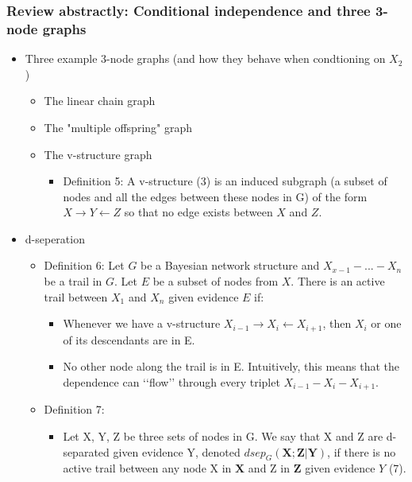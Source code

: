 \documentclass[10pt,containsverbatim,paralist]{article}
\begin{document}
\subsubsection*{Review abstractly: Conditional independence and three 3-node graphs}
\label{sec-1-1-4}
\begin{itemize}
\item Three example 3-node graphs (and how they behave when condtioning on $X_2$)
\label{sec-1-1-4-1}
\begin{itemize}
\item The linear chain graph
\label{sec-1-1-4-1-1}
\item The "multiple offspring" graph
\label{sec-1-1-4-1-2}
\item The v-structure graph
\label{sec-1-1-4-1-3}
\begin{itemize}
\item Definition 5:
\label{sec-1-1-4-1-3-1}
A v-structure (3) is an induced subgraph (a subset of nodes and all the edges between these nodes in G) of the form $X\rightarrow Y \leftarrow Z$ so that no edge exists between $X$ and
$Z$.
\end{itemize}
\end{itemize}
\item d-seperation
\label{sec-1-1-4-2}
\begin{itemize}
\item Definition 6:
\label{sec-1-1-4-2-1}
Let $G$ be a Bayesian network structure and $X_{x-1}-...-X_n$ be a trail in $G$.
Let $E$ be a subset of nodes from $X$. There is an active trail between $X_1$
and $X_n$ given evidence $E$ if:
\begin{itemize}
\item Whenever we have a v-structure $X_{i-1}\rightarrow X_i \leftarrow X_{i+1}$, then $X_i$ or one of its descendants are in E.
\label{sec-1-1-4-2-1-1}
\item No other node along the trail is in E.
\label{sec-1-1-4-2-1-2}
Intuitively, this means that the dependence can ‘‘flow’’ through every triplet $X_{i-1}-X_i-X_{i+1}$.
\end{itemize}
\item Definition 7:
\label{sec-1-1-4-2-2}
\begin{itemize}
\item Let X, Y, Z be three sets of nodes in G. We say that X and Z are d-separated given evidence Y, denoted $dsep_G (\mathbf{X};\mathbf{Z}|\mathbf{Y})$, if there is no active trail between any node X in $\mathbf{X}$ and Z in $\mathbf{Z}$ given evidence $Y$ (7).
\label{sec-1-1-4-2-2-1}

\end{itemize}
\end{itemize}
\end{itemize}
\end{document}
